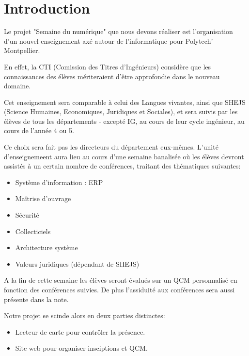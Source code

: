 \chapter{Introduction}
Le projet "Semaine du numérique" que nous devons réaliser est l’organisation
d'un nouvel enseignement axé autour de l'informatique pour Polytech' Montpellier.

En effet, la CTI (Comission des Titres d'Ingénieurs) considère que les 
connaissances des élèves mériteraient d'être approfondie dans le nouveau
domaine.

Cet enseignement sera comparable à celui des Langues vivantes, ainsi que 
SHEJS (Science Humaines, Economiques, Juridiques et Sociales), et sera suivis 
par les élèves de tous les départements - excepté IG, au cours de leur cycle 
ingénieur, au cours de l'année 4 ou 5.

Ce choix sera fait pas les directeurs du département eux-mêmes. L'unité 
d'enseignemeent aura lieu au cours d'une semaine banalisée où les élèves 
devront assistés à un certain nombre de conférences, traitant des thématiques 
suivantes:

\begin{itemize}
\item Système d’information : ERP
\item Maîtrise d’ouvrage
\item Sécurité
\item Collecticiels
\item Architecture système
\item Valeurs juridiques (dépendant de SHEJS)
\end{itemize}

A la fin de cette semaine les élèves seront évalués sur un QCM personnalisé 
en fonction des conférences suivies. De plus l'assiduité aux conférences sera 
aussi présente dans la note.

Notre projet se scinde alors en deux parties distinctes:
\begin{itemize}
\item Lecteur de carte pour contrôler la présence.
\item Site web pour organiser insciptions et QCM.
\end{itemize}
